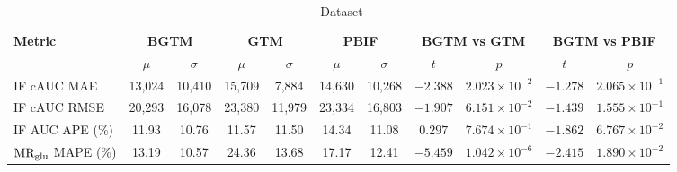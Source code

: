 \begin{sidewaystable}[b]
	\centering
	\small
	\setlength{\tabcolsep}{10pt}
	\caption*{\fdg\ Dataset}
	\begin{tabular}{l|cc|cc|cc|cc|cc}
		\toprule
		\multirow{2}{*}{\textbf{Metric}} & \multicolumn{2}{c|}{\textbf{BGTM}} & \multicolumn{2}{c|}{\textbf{GTM}} & \multicolumn{2}{c|}{\textbf{PBIF}} & \multicolumn{2}{c|}{\textbf{BGTM vs GTM}} & \multicolumn{2}{c}{\textbf{BGTM vs PBIF}}                                                                                                                  \\
		\cmidrule(lr){2-3} \cmidrule(lr){4-5} \cmidrule(lr){6-7} \cmidrule(lr){8-9} \cmidrule(lr){10-11}
		                                 & \(\mu\)                            & \(\sigma\)                        & \(\mu\)                            & \(\sigma\)                                & \(\mu\)                                   & \(\sigma\) & \(t\)      & \(p\)                              & \(t\)      & \(p\)                              \\
		\midrule
		IF cAUC MAE                      & 13{,}024                           & 10{,}410                          & 15{,}709                           & 7{,}884                                   & 14{,}630                                  & 10{,}268   & \(-2.388\) & \(2.023\times 10^{-2}\) \sym{*}    & \(-1.278\) & \(2.065\times 10^{-1}\)            \\
		IF cAUC RMSE                     & 20{,}293                           & 16{,}078                          & 23{,}380                           & 11{,}979                                  & 23{,}334                                  & 16{,}803   & \(-1.907\) & \(6.151\times 10^{-2}\) \sym{\dag} & \(-1.439\) & \(1.555\times 10^{-1}\)            \\
		IF AUC APE (\%)                  & 11.93                              & 10.76                             & 11.57                              & 11.50                                     & 14.34                                     & 11.08      & \(0.297\)  & \(7.674\times 10^{-1}\)            & \(-1.862\) & \(6.767\times 10^{-2}\) \sym{\dag} \\
		\midrule
		\(\text{MR}_{\text{glu}}\) MAPE (\%)             & 13.19                              & 10.57                             & 24.36                              & 13.68                                     & 17.17                                     & 12.41      & \(-5.459\) & \(1.042\times 10^{-6}\) \sym{***}  & \(-2.415\) & \(1.890\times 10^{-2}\) \sym{*}    \\

\end{tabular}
\end{sidewaystable}
